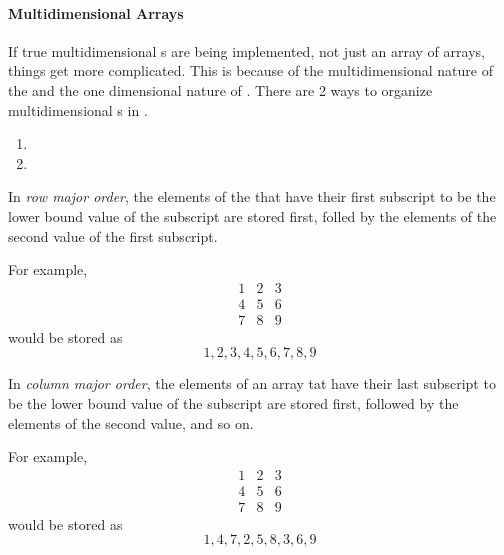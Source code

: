 \paragraph{Multidimensional Arrays}\label{par:Array-Multidimensional}
If true multidimensional s are being implemented, not just an array of arrays, things get more complicated.
This is because of the multidimensional nature of the  and the one dimensional nature of .
There are 2 ways to organize multidimensional s in .
\begin{enumerate}[noitemsep]
\item {}
\item {}
\end{enumerate}

\begin{definition}\label{def:Row_Major_Order}
  In \emph{row major order}, the elements of the  that have their first subscript to be the lower bound value of the subscript are stored first, folled by the elements of the second value of the first subscript.

  For example,
  \begin{align*}
    1 & 2 & 3 \\
    4 & 5 & 6 \\
    7 & 8 & 9
  \end{align*}
  would be stored as
  \begin{equation*}
    1, 2, 3, 4, 5, 6, 7, 8, 9
  \end{equation*}
\end{definition}

\begin{definition}\label{def:Column_Major_Order}
  In \emph{column major order}, the elements of an array tat have their last subscript to be the lower bound value of the subscript are stored first, followed by the elements of the second value, and so on.

  For example,
  \begin{align*}
    1 & 2 & 3 \\
    4 & 5 & 6 \\
    7 & 8 & 9
  \end{align*}
  would be stored as
  \begin{equation*}
    1, 4, 7, 2, 5, 8, 3, 6, 9
  \end{equation*}
\end{definition}

